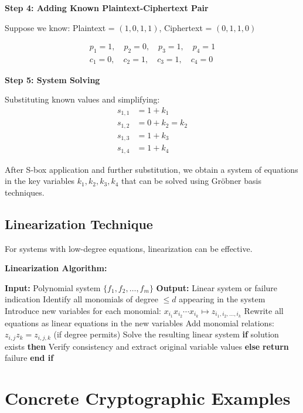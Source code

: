 \documentclass[12pt,a4paper]{article}
\newcommand{\Grobner}{Gr\"{o}bner}
\begin{document}
\textbf{Step 4: Adding Known Plaintext-Ciphertext Pair}

Suppose we know: Plaintext = $(1,0,1,1)$, Ciphertext = $(0,1,1,0)$

\begin{align}
p_1 = 1, \quad p_2 = 0, \quad p_3 = 1, \quad p_4 = 1 \\
c_1 = 0, \quad c_2 = 1, \quad c_3 = 1, \quad c_4 = 0
\end{align}

\textbf{Step 5: System Solving}

Substituting known values and simplifying:
\begin{align}
s_{1,1} &= 1 + k_1 \\
s_{1,2} &= 0 + k_2 = k_2 \\
s_{1,3} &= 1 + k_3 \\
s_{1,4} &= 1 + k_4
\end{align}

After S-box application and further substitution, we obtain a system of equations in the key variables $k_1, k_2, k_3, k_4$ that can be solved using \Grobner{} basis techniques.

\subsection{Linearization Technique}

For systems with low-degree equations, linearization can be effective.

\begin{algorithmbox}
\textbf{Linearization Algorithm:}
\begin{algorithmic}[1]
\STATE \textbf{Input:} Polynomial system $\{f_1, f_2, \ldots, f_m\}$
\STATE \textbf{Output:} Linear system or failure indication
\STATE
\STATE Identify all monomials of degree $\leq d$ appearing in the system
\STATE Introduce new variables for each monomial: $x_{i_1} x_{i_2} \cdots x_{i_k} \mapsto z_{i_1,i_2,\ldots,i_k}$
\STATE Rewrite all equations as linear equations in the new variables
\STATE Add monomial relations: $z_{i,j} z_k = z_{i,j,k}$ (if degree permits)
\STATE Solve the resulting linear system
\STATE \textbf{if} solution exists \textbf{then}
\STATE \quad Verify consistency and extract original variable values
\STATE \textbf{else}
\STATE \quad \textbf{return} failure
\STATE \textbf{end if}
\end{algorithmic}
\end{algorithmbox}

\section{Concrete Cryptographic Examples}
\end{document}
